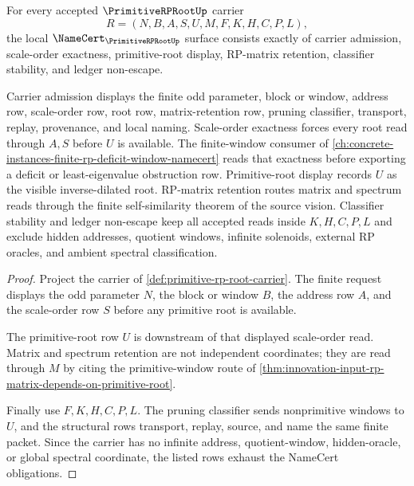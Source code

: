 \begin{theorem}
\label{thm:primitive-rp-root-namecert-obligations}
For every accepted $\PrimitiveRPRootUp$ carrier
$$
R=(N,B,A,S,U,M,F,K,H,C,P,L),
$$
the local $\NameCert_{\PrimitiveRPRootUp}$ surface consists exactly of carrier admission, scale-order exactness, primitive-root display, RP-matrix retention, classifier stability, and ledger non-escape.

Carrier admission displays the finite odd parameter, block or window, address row, scale-order row, root row, matrix-retention row, pruning classifier, transport, replay, provenance, and local naming. Scale-order exactness forces every root read through $A,S$ before $U$ is available. The finite-window consumer of \autoref{ch:concrete-instances-finite-rp-deficit-window-namecert} reads that exactness before exporting a deficit or least-eigenvalue obstruction row. Primitive-root display records $U$ as the visible inverse-dilated root. RP-matrix retention routes matrix and spectrum reads through the finite self-similarity theorem of the source vision. Classifier stability and ledger non-escape keep all accepted reads inside $K,H,C,P,L$ and exclude hidden addresses, quotient windows, infinite solenoids, external RP oracles, and ambient spectral classification.
\end{theorem}
\begin{proof}
Project the carrier of \autoref{def:primitive-rp-root-carrier}. The finite request displays the odd parameter $N$, the block or window $B$, the address row $A$, and the scale-order row $S$ before any primitive root is available.

The primitive-root row $U$ is downstream of that displayed scale-order read. Matrix and spectrum retention are not independent coordinates; they are read through $M$ by citing the primitive-window route of \autoref{thm:innovation-input-rp-matrix-depends-on-primitive-root}.

Finally use $F,K,H,C,P,L$. The pruning classifier sends nonprimitive windows to $U$, and the structural rows transport, replay, source, and name the same finite packet. Since the carrier has no infinite address, quotient-window, hidden-oracle, or global spectral coordinate, the listed rows exhaust the NameCert obligations.
\end{proof}

